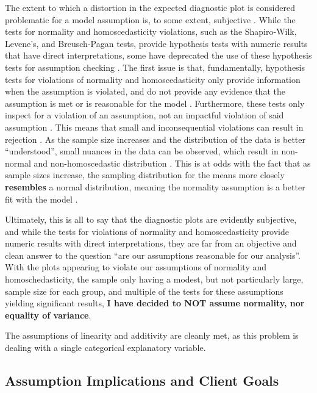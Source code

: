 \documentclass{article}
\begin{document}
The extent to which a distortion in the expected diagnostic plot is considered problematic for a model assumption is, to some extent, subjective \cite{blagus2019goodnessoffittestinglinearregression}. While the tests for normality and homoscedasticity violations, such as the  Shapiro-Wilk, Levene's, and Breusch-Pagan tests, provide hypothesis tests with numeric results that have direct interpretations, some have deprecated the use of these hypothesis tests for assumption checking \cite{shatz2024assumption}. The first issue is that, fundamentally, hypothesis tests for violations of normality and homoscedasticity only provide information when the assumption is violated, and do not provide any evidence that the assumption is met or is reasonable for the model \cite{shatz2024assumption}. Furthermore, these tests only inspect for a violation of an assumption, not an impactful violation of said assumption \cite{shatz2024assumption}. This means that small and inconsequential violations can result in rejection \cite{shatz2024assumption}. As the sample size increases and the distribution of the data is better ``understood'', small nuances in the data can be observed, which result in non-normal and non-homoscedastic distribution \cite{shatz2024assumption}. This is at odds with the fact that as sample sizes increase, the sampling distribution for the means more closely \textbf{resembles} a normal distribution, meaning the normality assumption is a better fit with the model \cite{delacre2019welch}. 

Ultimately, this is all to say that the diagnostic plots are evidently subjective, and while the tests for violations of normality and homoscedasticity provide numeric results with direct interpretations, they are far from an objective and clean answer to the question ``are our assumptions reasonable for our analysis''. With the plots appearing to violate our assumptions of normality and homoschedasticity, the sample only having a modest, but not particularly large, sample size for each group, and multiple of the tests for these assumptions yielding significant results, \textbf{I have decided to NOT assume normality, nor equality of variance}.

The assumptions of linearity and additivity are cleanly met, as this problem is dealing with a single categorical explanatory variable. 

\subsection{Assumption Implications and Client Goals}
\end{document}
